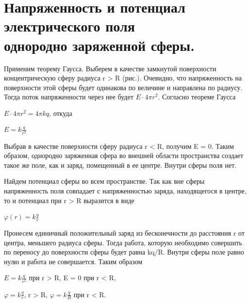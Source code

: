 \documentclass[12pt]{report}
\begin{document}
\section{Напряженность и потенциал электрического поля\\ однородно заряженной сферы.}
Применим теорему Гаусса. Выберем в качестве замкнутой поверхности концентрическую сферу радиуса r > R (рис.). Очевидно, что напряженность на поверхности этой сферы будет одинакова по величине и направлена по радиусу. Тогда поток напряженности через нее будет $E \cdot 4\pi r^2$. Согласно теореме Гаусса
\begin{center}
    $E \cdot 4 \pi r^2 = 4 \pi k q$, откуда
\end{center}
\begin{center}
    $E = k \frac{q}{r^2}$
\end{center}
\par Выбрав в качестве поверхности сферу радиуса r < R, получим E = 0.
Таким образом, однородно заряженная сфера во внешней области пространства
создает такое же поле, как и заряд, помещенный в ее центре.
Внутри сферы поля нет.

Найдем потенциал сферы во всем пространстве.
Так как вне сферы напряженность поля совпадает с напряженностью заряда,
находящегося в центре, то и потенциал при r > R выразится в виде
\begin{center}
    $\varphi(r) = k \frac{q}{r}$
\end{center}
Пронесем единичный положительный заряд из бесконечности до расстояния r от центра,
меньшего радиуса сферы.
Тогда работа, которую необходимо совершить по переносу
до поверхности сферы будет равна kq/R.
Внутри сферы поле равно нулю и работа не совершается. Таким образом
\begin{center}
    $E = k \frac{q}{r^2}$ при r > R, E = 0 при r < R,
\end{center}
\begin{center}
    $\varphi = k \frac{q}{r}$, r > R, $\varphi = k \frac{q}{R}$ при r < R.
\end{center}
\end{document}
